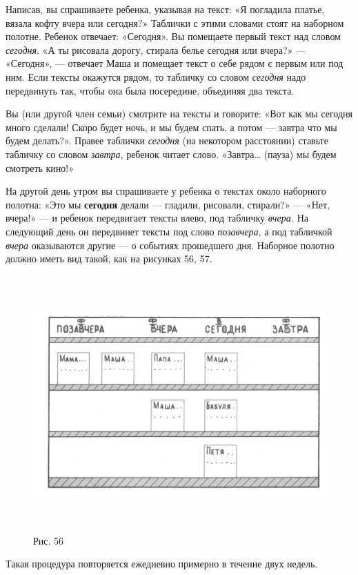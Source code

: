 \documentclass{book}
\renewcommand{\emph}[1]{\textit{#1}}
\begin{document}
Написав, вы спрашиваете ребенка, указывая на текст: «Я погладила платье,
вязала кофту вчера или сегодня?» Таблички с этими словами стоят на
наборном полотне. Ребенок отвечает: «Сегодня». Вы помещаете первый текст
над словом \emph{сегодня}. «А ты рисовала дорогу, стирала белье сегодня
или вчера?» --- «Сегодня», --- отвечает Маша и помещает текст о себе
рядом с первым или под ним. Если тексты окажутся рядом, то табличку со
словом \emph{сегодня} надо передвинуть так, чтобы она была посередине,
объединяя два текста.

Вы (или другой член семьи) смотрите на тексты и говорите: «Вот как мы
сегодня много сделали! Скоро будет ночь, и мы будем спать, а потом ---
завтра что мы будем делать?». Правее таблички \emph{сегодня} (на
некотором расстоянии) ставьте табличку со словом \emph{завтра}, ребенок
читает слово. «Завтра\ldots{} (пауза) мы будем смотреть кино!»

На другой день утром вы спрашиваете у ребенка о текстах около наборного
полотна: «Это мы \textbf{сегодня} делали --- гладили, рисовали,
стирали?» --- «Нет, вчера!» --- и ребенок передвигает тексты влево, под
табличку \emph{вчера.} На следующий день он передвинет тексты под слово
\emph{позавчера,} а под табличкой \emph{вчера} оказываются другие --- о
событиях прошедшего дня. Наборное полотно должно иметь вид такой, как на
рисунках 56, 57.

\begin{figure}
\centering
\includegraphics[width=5.87236in,height=3.85765in]{media/media/image53.jpg}
\caption*{Рис. 56}
\end{figure}


Такая процедура повторяется ежедневно примерно в течение двух недель.
\end{document}
